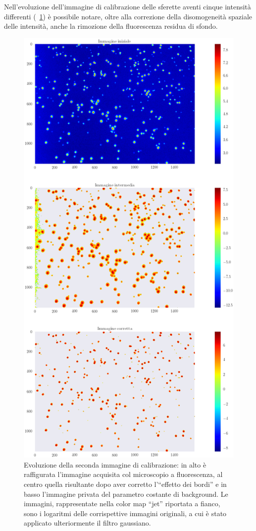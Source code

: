 Nell'evoluzione dell'immagine di calibrazione delle sferette aventi cinque intensità differenti (\figurename~\ref{fig:lg2}) è possibile notare, oltre alla correzione della disomogeneità spaziale delle intensità, anche la rimozione della fluorescenza residua di sfondo.

\begin{figure}
 \centering
 \includegraphics[scale=.50]{img/CAP4lg2.png}
 \caption{\small{Evoluzione della seconda immagine di calibrazione: in alto è raffigurata l'immagine acquisita col microscopio a fluorescenza, al centro quella risultante dopo aver corretto l'``effetto dei bordi'' e in basso l'immagine privata del parametro costante di background. Le immagini, rappresentate nella color map ``jet'' riportata a fianco, sono i logaritmi delle corrispettive immagini originali, a cui è stato applicato ulteriormente il filtro gaussiano.}}
 \label{fig:lg2}
\end{figure}

